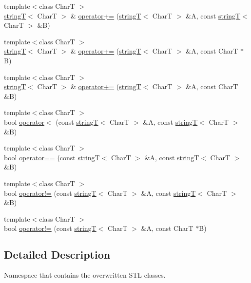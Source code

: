 \begin{DoxyCompactItemize}
{\footnotesize template$<$class CharT $>$ }\\\hyperlink{classfm_1_1stringT}{stringT}$<$ CharT $>$ \& \hyperlink{namespacefm_ae2a51530ac520855c418d672364f8a8c}{operator+=} (\hyperlink{classfm_1_1stringT}{stringT}$<$ CharT $>$ \&A, const \hyperlink{classfm_1_1stringT}{stringT}$<$ CharT $>$ \&B)
\item 
{\footnotesize template$<$class CharT $>$ }\\\hyperlink{classfm_1_1stringT}{stringT}$<$ CharT $>$ \& \hyperlink{namespacefm_a84c48305a88f6e91eb9355b3d6d4402b}{operator+=} (\hyperlink{classfm_1_1stringT}{stringT}$<$ CharT $>$ \&A, const CharT $\ast$B)
\item 
{\footnotesize template$<$class CharT $>$ }\\\hyperlink{classfm_1_1stringT}{stringT}$<$ CharT $>$ \& \hyperlink{namespacefm_a75a83dfab92ba8527822533f5e85d788}{operator+=} (\hyperlink{classfm_1_1stringT}{stringT}$<$ CharT $>$ \&A, const CharT \&B)
\item 
{\footnotesize template$<$class CharT $>$ }\\bool \hyperlink{namespacefm_a242945dabb23c11e3d1ba4028f46237f}{operator$<$} (const \hyperlink{classfm_1_1stringT}{stringT}$<$ CharT $>$ \&A, const \hyperlink{classfm_1_1stringT}{stringT}$<$ CharT $>$ \&B)
\item 
{\footnotesize template$<$class CharT $>$ }\\bool \hyperlink{namespacefm_ab5395f6c2bb26023b1f5323cbb6322ab}{operator==} (const \hyperlink{classfm_1_1stringT}{stringT}$<$ CharT $>$ \&A, const \hyperlink{classfm_1_1stringT}{stringT}$<$ CharT $>$ \&B)
\item 
{\footnotesize template$<$class CharT $>$ }\\bool \hyperlink{namespacefm_aae637edcca728debaa3e9e3a4ce913b5}{operator!=} (const \hyperlink{classfm_1_1stringT}{stringT}$<$ CharT $>$ \&A, const \hyperlink{classfm_1_1stringT}{stringT}$<$ CharT $>$ \&B)
\item 
{\footnotesize template$<$class CharT $>$ }\\bool \hyperlink{namespacefm_a289fcca02fd1babcb8bdf4c25b20570c}{operator!=} (const \hyperlink{classfm_1_1stringT}{stringT}$<$ CharT $>$ \&A, const CharT $\ast$B)
\end{DoxyCompactItemize}


\subsection{Detailed Description}
Namespace that contains the overwritten STL classes. 

